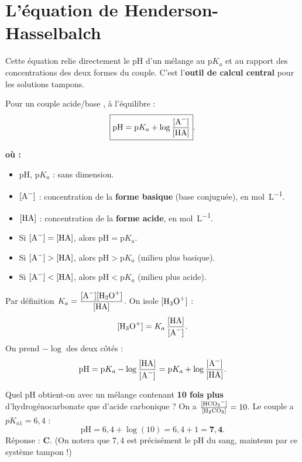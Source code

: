 \documentclass[11pt,a4paper]{article}
\newenvironment{ou}{%
  \par\smallskip\noindent\textbf{où :}\nopagebreak
  \begin{itemize}[leftmargin=1.8em,topsep=2pt,itemsep=1.5pt,parsep=0pt]}%
  {\end{itemize}}
\begin{document}
\section{L'équation de Henderson-Hasselbalch}
Cette équation relie directement le pH d'un mélange au $\mathrm{p}K_a$ et au rapport des concentrations des
deux formes du couple. C'est l'\textbf{outil de calcul central} pour les solutions tampons.

\begin{formule}
Pour un couple acide/base , à l'équilibre :
\[ \boxed{\mathrm{pH} = \mathrm{p}K_a + \log\frac{[\ce{A-}]}{[\ce{HA}]}}. \]
\end{formule}

\begin{ou}
\item $\mathrm{pH}$, $\mathrm{p}K_a$ : sans dimension.
\item $[\ce{A-}]$ : concentration de la \textbf{forme basique} (base conjuguée), en \si{mol.L^{-1}}.
\item $[\ce{HA}]$ : concentration de la \textbf{forme acide}, en \si{mol.L^{-1}}.
\item Si $[\ce{A-}] = [\ce{HA}]$, alors $\mathrm{pH} = \mathrm{p}K_a$.
\item Si $[\ce{A-}] > [\ce{HA}]$, alors $\mathrm{pH} > \mathrm{p}K_a$ (milieu plus basique).
\item Si $[\ce{A-}] < [\ce{HA}]$, alors $\mathrm{pH} < \mathrm{p}K_a$ (milieu plus acide).
\end{ou}

\begin{methode}[démonstration]
Par définition $K_a = \dfrac{[\ce{A-}][\ce{H3O+}]}{[\ce{HA}]}$. On isole $[\ce{H3O+}]$ :
\[ [\ce{H3O+}] = K_a\,\frac{[\ce{HA}]}{[\ce{A-}]}. \]
On prend $-\log$ des deux côtés :
\[ \mathrm{pH} = \mathrm{p}K_a - \log\frac{[\ce{HA}]}{[\ce{A-}]} = \mathrm{p}K_a + \log\frac{[\ce{A-}]}{[\ce{HA}]}. \]
\end{methode}

\begin{exemple}
Quel pH obtient-on avec un mélange contenant \textbf{10 fois plus} d'hydrogénocarbonate  que
d'acide carbonique  ? On a $\frac{[\ce{HCO3-}]}{[\ce{H2CO3}]} = 10$. Le couple
 a $pK_{a1} = 6{,}4$ :
\[ \mathrm{pH} = 6{,}4 + \log(10) = 6{,}4 + 1 = \mathbf{7{,}4}. \]
Réponse : \textbf{C}. (On notera que $7{,}4$ est précisément le pH du sang, maintenu par ce système tampon !)
\end{exemple}
\end{document}
